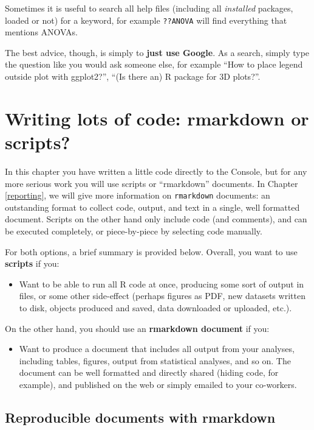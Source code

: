 \documentclass[]{book}
\providecommand{\tightlist}{%
  \setlength{\itemsep}{0pt}\setlength{\parskip}{0pt}}
\begin{document}
Sometimes it is useful to search all help files (including all \emph{installed} packages, loaded or not) for a keyword, for example \texttt{??ANOVA} will find everything that mentions ANOVAs.

The best advice, though, is simply to \textbf{just use Google}. As a search, simply type the question like you would ask someone else, for example ``How to place legend outside plot with ggplot2?'', ``(Is there an) R package for 3D plots?''.

\hypertarget{writing-lots-of-code-rmarkdown-or-scripts}{%
\section{Writing lots of code: rmarkdown or scripts?}\label{writing-lots-of-code-rmarkdown-or-scripts}}

In this chapter you have written a little code directly to the Console, but for any more serious work you will use scripts or ``rmarkdown'' documents. In Chapter \ref{reporting}, we will give more information on \texttt{rmarkdown} documents: an outstanding format to collect code, output, and text in a single, well formatted document. Scripts on the other hand only include code (and comments), and can be executed completely, or piece-by-piece by selecting code manually.

For both options, a brief summary is provided below. Overall, you want to use \textbf{scripts} if you:

\begin{itemize}
\tightlist
\item
  Want to be able to run all R code at once, producing some sort of output in files, or some other side-effect (perhaps figures as PDF, new datasets written to disk, objects produced and saved, data downloaded or uploaded, etc.).
\end{itemize}

On the other hand, you should use an \textbf{rmarkdown document} if you:

\begin{itemize}
\tightlist
\item
  Want to produce a document that includes all output from your analyses, including tables, figures, output from statistical analyses, and so on. The document can be well formatted and directly shared (hiding code, for example), and published on the web or simply emailed to your co-workers.
\end{itemize}

\hypertarget{reproducible-documents-with-rmarkdown}{%
\subsection{Reproducible documents with rmarkdown}\label{reproducible-documents-with-rmarkdown}}
\end{document}
